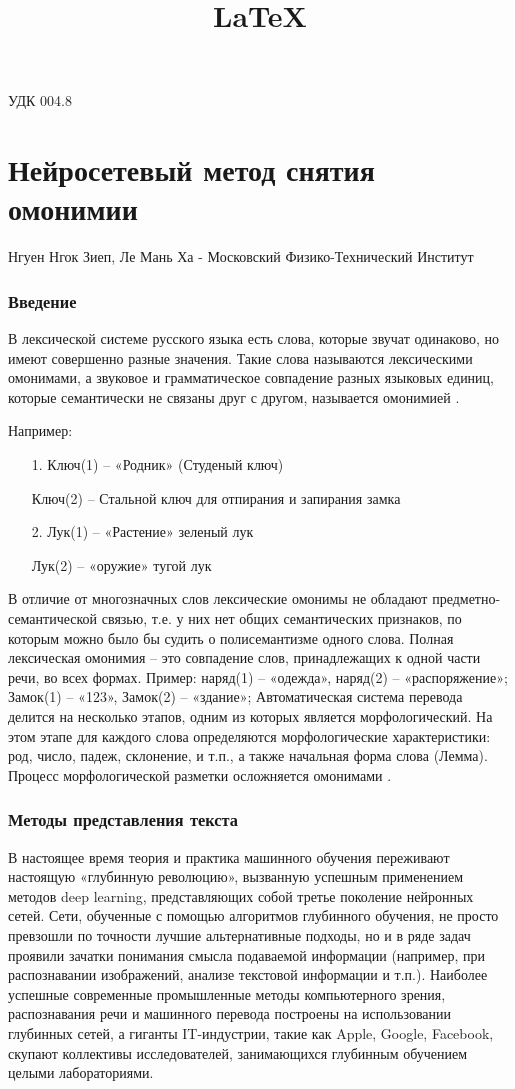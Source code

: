 \documentclass[12pt]{article}
\title{\LaTeX}
\date{}
\begin{document}
\def\dd#1#2{\frac{\partial#1}{\partial#2}}

{\large УДК 004.8}
\part*{Нейросетевый метод снятия омонимии}
Нгуен Нгок Зиеп, Ле Мань Ха - Московский Физико-Технический Институт

\section{Введение}

В лексической системе русского языка есть слова, которые звучат одинаково, но имеют совершенно разные значения. Такие слова называются лексическими омонимами, а звуковое и грамматическое совпадение разных языковых единиц, которые семантически не связаны друг с другом, называется омонимией \cite{Homonym}.

Например:
\begin{itemize}
\item[1.] Ключ(1) – «Родник» (Студеный ключ)
\item[] Ключ(2) – Стальной ключ для отпирания и запирания замка
\item[2.] Лук(1) – «Растение» зеленый лук
\item[] Лук(2) – «оружие» тугой лук
\end{itemize}

В отличие от многозначных слов лексические омонимы не обладают предметно-семантической связью, т.е. у них нет общих семантических признаков, по которым можно было бы судить о полисемантизме одного слова. Полная лексическая омонимия – это совпадение слов, принадлежащих к одной части речи, во всех формах. Пример: наряд(1) – «одежда», наряд(2) – «распоряжение»; Замок(1) – «123», Замок(2) – «здание»; Автоматическая система перевода делится на несколько этапов, одним из которых является морфологический. На этом этапе для каждого слова определяются морфологические характеристики: род, число, падеж, склонение, и т.п., а также начальная форма слова (Лемма). Процесс морфологической разметки осложняется омонимами \cite{Homonym}.


\section{Методы представления текста}
В настоящее время теория и практика машинного обучения переживают настоящую «глубинную революцию», вызванную успешным применением методов deep learning, представляющих собой третье поколение нейронных сетей. Сети, обученные с помощью алгоритмов глубинного обучения, не просто превзошли по точности лучшие альтернативные подходы, но и в ряде задач проявили зачатки понимания смысла подаваемой информации (например, при распознавании изображений, анализе текстовой информации и т.п.). Наиболее успешные современные промышленные методы компьютерного зрения, распознавания речи и машинного перевода построены на использовании глубинных сетей, а гиганты IT-индустрии, такие как Apple, Google, Facebook, скупают коллективы исследователей, занимающихся глубинным обучением целыми лабораториями.
\end{document}
